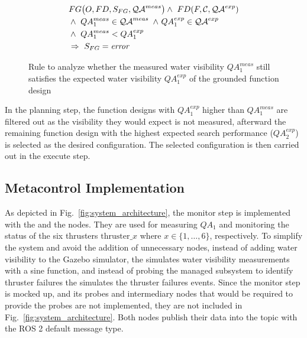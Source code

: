 \begin{figure}[t]
    \centering
    \begin{align}
    &FG\bigl(O, FD, S_{FG}, \qa^{meas}\bigr) \wedge ~ FD(F, \mathcal{C}, \qa^{exp}) \label{eq:fg}\\ %
    & \wedge ~ QA_1^{meas} \in \qa^{meas}
    ~\wedge ~ QA_1^{exp} \in \qa^{exp} \label{eq:qas_contained}\\ %
    &\wedge ~ QA_1^{meas} < QA_1^{exp} \label{eq:meas_less_exp}\\ %
    &\Rightarrow ~ S_{FG} = \text{\emph{error}} \label{eq:status_error}
\end{align}
\caption{Rule to analyze whether the measured water visibility $QA_1^{meas}$ still satisfies the expected water visibility $QA_1^{exp}$ of the grounded function design}\label{fig:swrl_rule} %
\end{figure}

In the planning step, the function designs with $QA_1^{exp}$ higher than $QA_1^{meas}$ are filtered out as the visibility they would expect is not measured, afterward the remaining function design with the highest expected search performance ($QA_2^{exp}$) is selected as the desired configuration. The selected configuration is then carried out in the execute step. %

\subsection{Metacontrol Implementation}

As depicted in Fig.~\ref{fig:system_architecture}, the monitor step is implemented with the  and the  nodes. They are used for measuring $QA_1$ and monitoring the status of the six thrusters $\text{thruster}\_x$ where $x\in\{1,\dots,6\}$, respectively.
To simplify the system and avoid the addition of unnecessary nodes, instead of adding water visibility to the Gazebo simulator, the  simulates water visibility measurements with a sine function, and instead of probing the managed subsystem to identify thruster failures the  simulates the thruster failures events. Since the monitor step is mocked up, and its probes and intermediary nodes that would be required to provide the probes are not implemented, they are not included in Fig.~\ref{fig:system_architecture}. Both nodes publish their data into the  topic with the ROS 2 default  message type.


